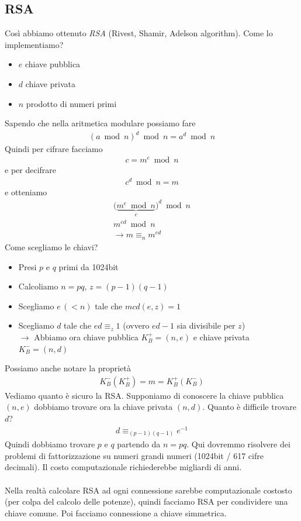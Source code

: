 \documentclass[a4paper,12pt]{article}
\begin{document}
\subsection{RSA}
\label{sec:rsa}
Così abbiamo ottenuto \textit{RSA} (Rivest, Shamir, Adelson algorithm). Come lo implementiamo?
\begin{itemize}
  \item $e$ chiave pubblica
  \item $d$ chiave privata
  \item $n$ prodotto di numeri primi
\end{itemize}
Sapendo che nella aritmetica modulare possiamo fare
\begin{align*}
  (a \bmod n)^d \bmod n = a^d \bmod n
\end{align*}
Quindi per cifrare facciamo
\begin{align*}
  c = m^e \bmod n
\end{align*}
e per decifrare
\begin{align*}
  c^d \bmod n = m
\end{align*}
e otteniamo
\begin{align*}
  \bigl(\underbrace{m^e \bmod n}_{c}\bigr)^d \bmod n \\
  m^{ed} \bmod n \\
  \to \boxed{m \equiv_n m^{ed}}
\end{align*}
Come scegliamo le chiavi?
\begin{itemize}
  \item Presi $p$ e $q$ primi da 1024bit
  \item Calcoliamo $n=pq, \, z=(p-1)(q-1)$
  \item Scegliamo $e \, (<n)$ tale che $mcd(e,z)=1$
  \item Scegliamo $d$ tale che $ed \equiv_z 1$ (ovvero $ed-1$ sia divisibile per $z$) \\
  $\to$ Abbiamo ora chiave pubblica $K_B^+ = (n,e)$ e chiave privata $K_B^- = (n,d)$ 
\end{itemize}
Possiamo anche notare la proprietà
\begin{align*}
  K_B^{-}(K_B^{+}) = m = K_B^{+}(K_B^{-})
\end{align*}
Vediamo quanto è sicuro la RSA. Supponiamo di conoscere la chiave pubblica $(n,e)$ dobbiamo trovare ora la chiave privata $(n,d)$. Quanto è difficile trovare $d$?
\begin{align*}
  d \equiv_{(p-1)(q-1)} e^{-1}
\end{align*}
Quindi dobbiamo trovare $p$ e $q$ partendo da $n=pq$. Qui dovremmo risolvere dei problemi di fattorizzazione su numeri grandi numeri (1024bit / 617 cifre decimali). Il costo computazionale richiederebbe migliardi di anni.\\
\vspace{1px}\\
Nella realtà calcolare RSA ad ogni connessione sarebbe computazionale costosto (per colpa del calcolo delle potenze), quindi facciamo RSA per condividere una chiave comune. Poi facciamo connessione a chiave simmetrica.
\end{document}
